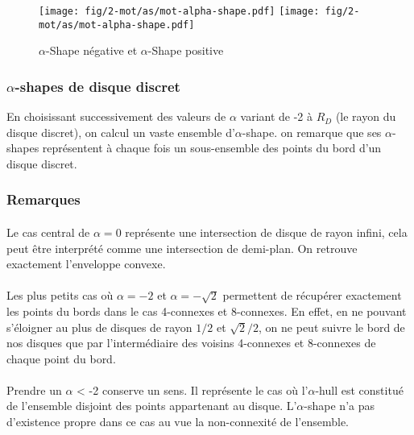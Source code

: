 \begin{figure}[h!]
  \centering
  \texttt{[image: fig/2-mot/as/mot-alpha-shape.pdf]}
  \texttt{[image: fig/2-mot/as/mot-alpha-shape.pdf]}
  \caption{$\alpha$-Shape négative et $\alpha$-Shape positive }
\end{figure}


\subsubsection{$\alpha$-shapes de disque discret}

En choisissant successivement des valeurs de $\alpha$ variant de -2 à $R_D$ (le rayon du disque discret), on calcul un vaste ensemble d'$\alpha$-shape. on remarque que ses $\alpha$-shapes représentent à chaque fois un sous-ensemble des points du bord d'un disque discret.


\subsubsection{Remarques}

\paragraph{}
Le cas central de $\alpha = 0$ représente une intersection de disque de rayon infini, cela peut être interprété comme une intersection de demi-plan. On retrouve exactement l'enveloppe convexe.

\paragraph{}
Les plus petits cas où $\alpha = -2$ et $\alpha = -\sqrt{2}$ permettent de récupérer exactement les points du bords dans le cas 4-connexes et 8-connexes. En effet, en ne pouvant s'éloigner au plus de disques de rayon $1/2$ et $\sqrt{2}/2$, on ne peut suivre le bord de nos disques que par l'intermédiaire des voisins 4-connexes et 8-connexes de chaque point du bord.

\paragraph{}
Prendre un $\alpha$ < -2 conserve un sens. Il représente le cas où l'$\alpha$-hull est constitué de l'ensemble disjoint des points appartenant au disque. L'$\alpha$-shape n'a pas d'existence propre dans ce cas au vue la non-connexité de l'ensemble.

